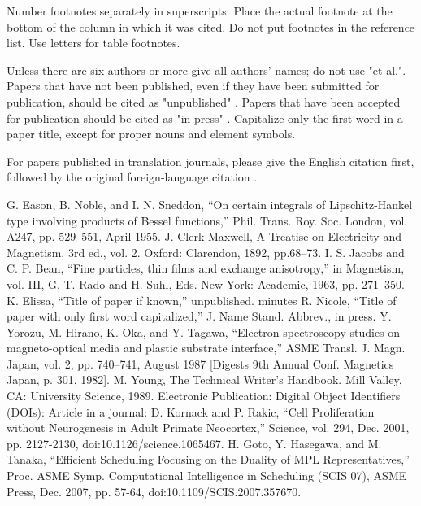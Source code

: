 \documentclass[conference]{IEEEtran}
\begin{document}
Number footnotes separately in superscripts. Place the actual footnote at the bottom of the column in which it was cited. Do not put footnotes in the reference list. Use letters for table footnotes.

Unless there are six authors or more give all authors’ names; do not use "et al.". Papers that have not been published, even if they have been submitted for publication, should be cited as "unpublished" \cite{b4}. Papers that have been accepted for publication should be cited as "in press" \cite{b5}. Capitalize only the first word in a paper title, except for proper nouns and element symbols.

For papers published in translation journals, please give the English citation first, followed by the original foreign-language citation \cite{b6}.

\begin{thebibliography}{00}
	 G. Eason, B. Noble, and I. N. Sneddon, “On certain integrals of Lipschitz-Hankel type involving products of Bessel functions,” Phil. Trans. Roy. Soc. London, vol. A247, pp. 529–551, April 1955. 
	 J. Clerk Maxwell, A Treatise on Electricity and Magnetism, 3rd ed., vol. 2. Oxford: Clarendon, 1892, pp.68–73.
	 I. S. Jacobs and C. P. Bean, “Fine particles, thin films and exchange anisotropy,” in Magnetism, vol. III, G. T. Rado and H. Suhl, Eds. New York: Academic, 1963, pp. 271–350.
	 K. Elissa, “Title of paper if known,” unpublished.
	 minutes
	 R. Nicole, “Title of paper with only first word capitalized,” J. Name Stand. Abbrev., in press.
	 Y. Yorozu, M. Hirano, K. Oka, and Y. Tagawa, “Electron spectroscopy studies on magneto-optical media and plastic substrate interface,” ASME Transl. J. Magn. Japan, vol. 2, pp. 740–741, August 1987 [Digests 9th Annual Conf. Magnetics Japan, p. 301, 1982].
	 M. Young, The Technical Writer’s Handbook. Mill Valley, CA: University Science, 1989.
	 Electronic Publication: Digital Object Identifiers (DOIs):
	Article in a journal:
	 D. Kornack and P. Rakic, “Cell Proliferation without Neurogenesis in Adult Primate Neocortex,” Science, vol. 294, Dec. 2001, pp. 2127-2130, doi:10.1126/science.1065467.
	 H. Goto, Y. Hasegawa, and M. Tanaka, “Efficient Scheduling Focusing on the Duality of MPL Representatives,” Proc. ASME Symp. Computational Intelligence in Scheduling (SCIS 07), ASME Press, Dec. 2007, pp. 57-64, doi:10.1109/SCIS.2007.357670.
\end{thebibliography}
\end{document}

